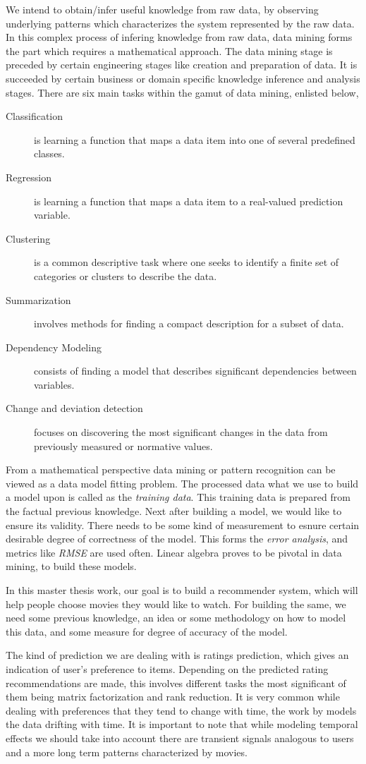 We intend to obtain/infer useful knowledge from raw data, by observing
underlying patterns which characterizes the system represented by the raw data.
In this complex process of infering knowledge from raw data, data mining forms
the part which requires a mathematical approach. The data mining stage is
preceded by certain engineering stages like creation and preparation of data. It
is succeeded by certain business or domain specific knowledge inference and
analysis stages. There are six main tasks within the gamut of data mining,
enlisted below, \cite{Fayyad96fromdata}
\begin{description}
  \item[Classification] is learning a function that maps a data item into one of
several predefined classes.
  \item[Regression] is learning a function that maps a data item to a
real-valued prediction variable.
  \item[Clustering] is a common descriptive task where one seeks to identify a
finite set of categories or clusters to describe the data.
  \item[Summarization] involves methods for finding a compact description for a
subset of data.
  \item[Dependency Modeling] consists of finding a model that describes
significant dependencies between variables.
\item[Change and deviation detection] focuses on discovering the most
significant changes in
the data from previously measured or normative values.
\end{description}

From a mathematical perspective data mining or pattern recognition can be viewed
as a data model fitting problem. The processed data what we use to build a
model upon is called as the \emph{training data}. This training data is prepared
from the factual previous knowledge. Next after building a model, we would like
to ensure its validity. There needs to be some kind of measurement to esnure
certain desirable degree of correctness of the model. This forms the \emph{error
analysis}, and metrics like \emph{RMSE} are used often. Linear algebra proves to
be pivotal in data mining, \cite{eld-mm:07} to build these models. 

In this master thesis work, our goal is to build a recommender system, which
will help people choose movies they would like to watch. For building the same,
we need some previous knowledge, an idea or some methodology on how to model
this data, and some measure for degree of accuracy of the model.

The kind of prediction we are dealing with is ratings prediction, which gives
an indication of user's preference to items. Depending on the predicted rating
recommendations are made, this involves different tasks the most significant of
them being matrix factorization and rank reduction. It is very common while
dealing with preferences that they tend to change with time, the work by
\cite{Koren:2010:CFT:1721654.1721677} models the data drifting with time. It is
important to note that while modeling temporal effects we should take into
account there are transient signals analogous to users and a more long term
patterns characterized by movies.


